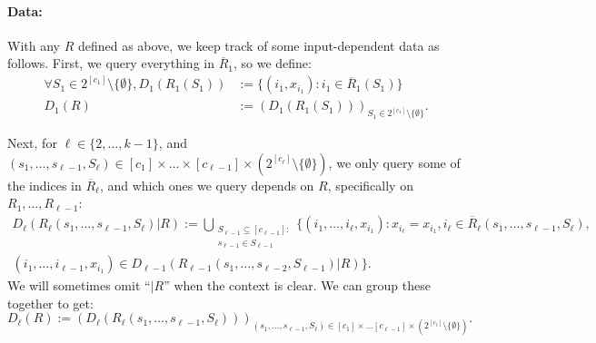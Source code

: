 \documentclass{theoretics}
\renewcommand{\>}{\rangle}
\newcommand{\<}{\langle}
\renewcommand{\(}{\left(}
\renewcommand{\)}{\right)}
\begin{document}
\paragraph{Data:} With any $R$ defined as above, we keep track of some input-dependent data as follows. First, we query everything in $\overline{R}_1$, so we define:
\begin{equation}
\begin{split}
\forall S_1\in 2^{[c_1]}\setminus\{\emptyset\}, D_1(R_1(S_1)) &:= \{(i_1,x_{i_1}): i_1\in \overline{R}_1(S_1)\}\\
D_1(R) &:= \left( D_1(R_1(S_1))\right)_{S_1\in 2^{[c_1]}\setminus\{\emptyset\}}.
\end{split}\label{eq:k-dist-D-1}
\end{equation}


Next, for $\ell\in \{2,\dots,k-1\}$, and $(s_1,\dots,s_{\ell-1},S_{\ell})\in [c_1]\times\dots\times [c_{\ell-1}]\times (2^{[c_{\ell}]}\setminus\{\emptyset\})$, we only query some of the indices in $\overline{R}_{\ell}$, and which ones we query depends on $R$, specifically on $R_1,\dots,R_{\ell-1}$:
\begin{multline}
D_{\ell}(R_{\ell}(s_1,\dots,s_{\ell-1},S_{\ell})|R) := \bigcup_{\substack{S_{\ell-1}\subseteq [c_{\ell-1}]:\\ s_{\ell-1}\in S_{\ell-1}}}
\big\{  
(i_1,\dots,i_{\ell},x_{i_1}):x_{i_{\ell}}=x_{i_1},i_{\ell}\in \overline{R}_{\ell}(s_1,\dots,s_{\ell-1},S_{\ell}),\\
 (i_1,\dots,i_{\ell-1},x_{i_1})\in D_{\ell-1}(R_{\ell-1}(s_1,\dots,s_{\ell-2},S_{\ell-1})|R)  
\big\}.
\label{eq:D-ell}
\end{multline}
We will sometimes omit ``$|R$'' when the context is clear. We can group these together to get:
\begin{equation}
D_{\ell}(R) := \left(D_{\ell}(R_{\ell}(s_1,\dots,s_{\ell-1},S_{\ell}))\right)_{(s_1,\dots,s_{\ell-1},S_{\ell})\in [c_1]\times\dots[c_{\ell-1}]\times (2^{[c_{\ell}]}\setminus\{\emptyset\})}.\label{eq:D-ell-R}
\end{equation}
\end{document}
